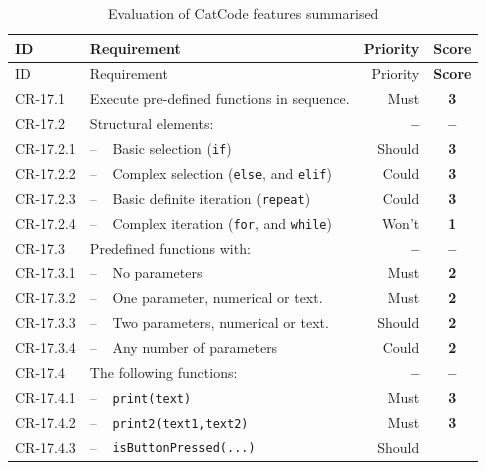 
\begin{center}
  \begin{longtable}{lp{0.5cm}p{7cm}rc}
    \caption{Evaluation of CatCode features summarised} \label{tab:results/cr/catCode-features} \\
    \toprule
    ID
    & \multicolumn{2}{l}{Requirement}
    & Priority
    & \textbf{Score} \\ \midrule
    \endfirsthead
    \toprule
    ID
    & \multicolumn{2}{l}{Requirement}
    & Priority
    & \textbf{Score}\\ \midrule
    \endhead
    CR-17.1
    & \multicolumn{2}{l}{Execute pre-defined functions in sequence.}
    & Must
    & \textbf{3}
    \\
    CR-17.2
    & \multicolumn{2}{l}{Structural elements:}
    & \textbf{--}
    & \textbf{--}
    \\
    CR-17.2.1
    & -- & Basic selection (\texttt{if})
    & Should
    & \textbf{3}
    \\
    CR-17.2.2
    & -- & Complex selection (\texttt{else}, and \texttt{elif})
    & Could
    & \textbf{3}
    \\
    CR-17.2.3
    & -- & Basic definite iteration (\texttt{repeat})
    & Could
    & \textbf{3}
    \\
    CR-17.2.4
    & -- & Complex iteration (\texttt{for}, and \texttt{while})
    & Won't
    & \textbf{1}
    \\
    CR-17.3
    & \multicolumn{2}{l}{Predefined functions with:}
    & \textbf{--}
    & \textbf{--}
    \\
    CR-17.3.1
    & -- & No parameters
    & Must
    & \textbf{2}
    \\
    CR-17.3.2
    & -- & One parameter, numerical or text.
    & Must
    & \textbf{2}
    \\
    CR-17.3.3
    & -- & Two parameters, numerical or text.
    & Should
    & \textbf{2}
    \\
    CR-17.3.4
    & -- & Any number of parameters
    & Could
    & \textbf{2}
    \\
    CR-17.4
    & \multicolumn{2}{l}{The following functions:}
    & \textbf{--}
    & \textbf{--}
    \\
    CR-17.4.1
    & -- & \texttt{print(text)}
    & Must
    & \textbf{3}
    \\
    CR-17.4.2
    & -- & \texttt{print2(text1,text2)}
    & Must
    & \textbf{3}
    \\
    CR-17.4.3
    & -- & \texttt{isButtonPressed(...)}
    & Should

\end{longtable}
\end{center}
